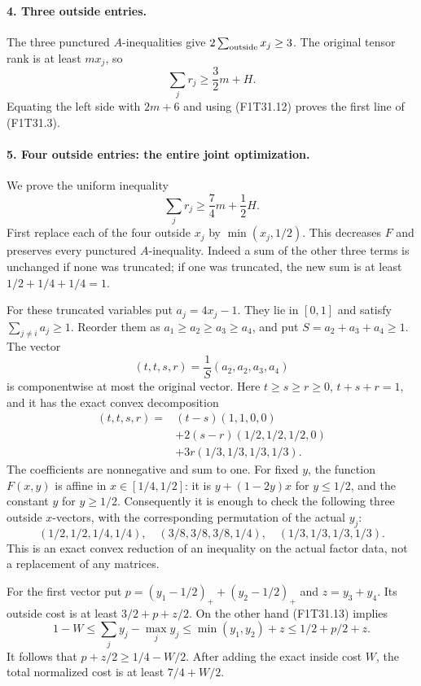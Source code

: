 \paragraph{4. Three outside entries.}
The three punctured \(A\)-inequalities give
\(2\sum_{\rm outside}x_j\ge3\).
The original tensor rank is at least \(mx_j\), so
\[
                  \sum_jr_j\ge\frac32m+H.
 \tag{F1T31.16}
\]
Equating the left side with \(2m+6\) and using
(F1T31.12) proves the first line of (F1T31.3).

\paragraph{5. Four outside entries: the entire joint optimization.}
We prove the uniform inequality
\[
                  \sum_jr_j\ge\frac74m+\frac12H.
 \tag{F1T31.17}
\]
First replace each of the four outside \(x_j\) by
\(\min(x_j,1/2)\). This decreases \(F\) and preserves
every punctured \(A\)-inequality. Indeed a sum of the
other three terms is unchanged if none was truncated;
if one was truncated, the new sum is at least
\(1/2+1/4+1/4=1\).

For these truncated variables put \(a_j=4x_j-1\).
They lie in \([0,1]\) and satisfy
\(\sum_{j\ne i}a_j\ge1\). Reorder them as
\(a_1\ge a_2\ge a_3\ge a_4\), and put
\(S=a_2+a_3+a_4\ge1\). The vector
\[
       (t,t,s,r)=\frac1S(a_2,a_2,a_3,a_4)
\]
is componentwise at most the original vector. Here
\(t\ge s\ge r\ge0\), \(t+s+r=1\), and it has
the exact convex decomposition
\[
 \begin{split}
 (t,t,s,r)={}&(t-s)(1,1,0,0)\\
 &+2(s-r)(1/2,1/2,1/2,0)\\
 &+3r(1/3,1/3,1/3,1/3).
 \end{split}
 \tag{F1T31.18}
\]
The coefficients are nonnegative and sum to one.
For fixed \(y\), the function \(F(x,y)\) is affine
in \(x\in[1/4,1/2]\): it is
\(y+(1-2y)x\) for \(y\le1/2\), and the constant
\(y\) for \(y\ge1/2\). Consequently it is enough
to check the following three outside \(x\)-vectors,
with the corresponding permutation of the actual \(y_j\):
\[
 (1/2,1/2,1/4,1/4),\quad
 (3/8,3/8,3/8,1/4),\quad
 (1/3,1/3,1/3,1/3).
 \tag{F1T31.19}
\]
This is an exact convex reduction of an inequality on
the actual factor data, not a replacement of any matrices.

For the first vector put
\(p=(y_1-1/2)_++(y_2-1/2)_+\) and \(z=y_3+y_4\).
Its outside cost is at least \(3/2+p+z/2\).
On the other hand (F1T31.13) implies
\[
 1-W\le\sum_jy_j-\max_jy_j
       \le\min(y_1,y_2)+z\le1/2+p/2+z.
\]
It follows that \(p+z/2\ge1/4-W/2\).
After adding the exact inside cost \(W\), the total
normalized cost is at least \(7/4+W/2\).

